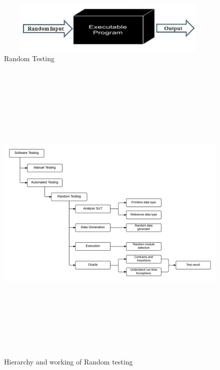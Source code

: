 \begin{figure}[h]
	\centering
	\includegraphics[width=11cm, height=2.5cm ]{chapter2/randomTesting.jpg}
	\caption{Random Testing}
\end{figure}



\begin{figure}[h]
	\centering
	\centerline{\includegraphics[width=16.5cm, height=15cm ]{chapter2/randomTestingFlow.png}}
	\caption{Hierarchy and working of Random testing}
\end{figure}

